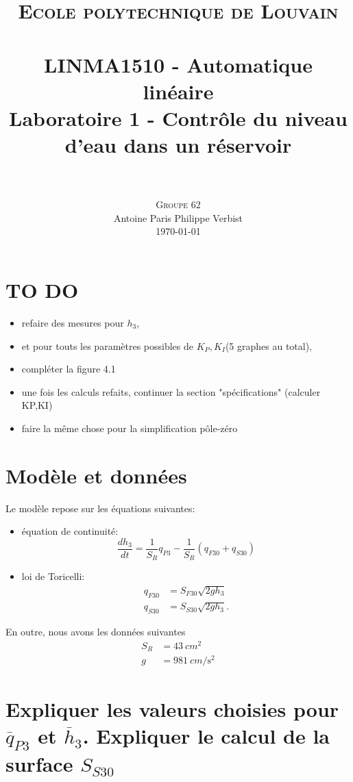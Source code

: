 \documentclass[frenchb, paper=a4, fontsize=11pt]{scrartcl}
\title{
		\usefont{OT1}{bch}{b}{n}
		\normalfont \normalsize \textsc{Ecole polytechnique de Louvain} \\ [25pt]
		\horrule{0.5pt} \\[0.4cm]
		\large LINMA1510 - Automatique linéaire\\
		\huge Laboratoire 1 - Contrôle du niveau d'eau dans un réservoir \\
		\horrule{1.5pt} \\[0.5cm]
}
\author{
		\normalfont
		\textsc{Groupe 62}\\
      	Antoine Paris\hspace{0.6cm} Philippe Verbist \\	
       	\normalsize
        \today
}
\date{}
\newcommand*\eq[1]{\overline{#1}} 				%
\numberwithin{equation}{section}					%
\numberwithin{figure}{section}					%
\numberwithin{table}{section}						%
\begin{document}
\maketitle

\section*{TO DO}

\begin{itemize}
\item refaire des mesures pour $h_3$,
\item et pour touts les paramètres possibles de $K_P,K_I$(5 graphes au total),
\item compléter la figure 4.1
\item une fois les calculs refaits, continuer la section "spécifications" (calculer KP,KI)
\item faire la même chose pour la simplification pôle-zéro
\end{itemize}


\section{Modèle et données}

Le modèle repose sur les équations suivantes:
\begin{itemize}
\item équation de continuité:
\begin{equation}
\frac{dh_3}{dt} = \frac{1}{S_R}q_{P3} - \frac{1}{S_R}(q_{F30}+q_{S30})
\label{eq:contnuity}
\end{equation}
\item loi de Toricelli:
\begin{align}
q_{F30}& = S_{F30} \sqrt{2gh_3} \label{eq:toricelliF}\\
q_{S30} &= S_{S30} \sqrt{2gh_3} \label{eq:toricelliS}.
\end{align}
\end{itemize}

En outre, nous avons les données suivantes
\begin{align}
S_R& = \SI{43}{cm^2}\\
g &= \SI{981}{cm\per\second^2}
\end{align}

\section{Expliquer les valeurs choisies pour $\eq{q}_{P3}$ et $\eq{h}_3$. Expliquer le calcul de la surface $S_{S30}$}
\end{document}
